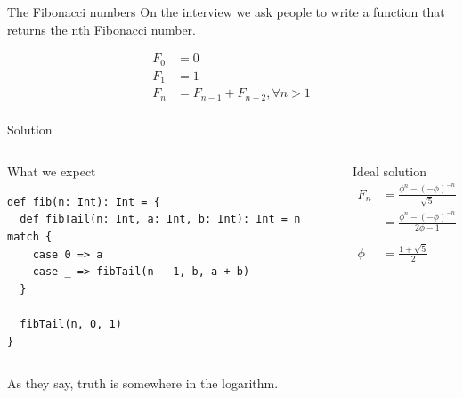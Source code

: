 \documentclass[presentation,aspectratio=169,smaller]{beamer}
\begin{document}
\begin{frame}[label={sec:orgd19d790}]{The Fibonacci numbers}
On the interview we ask people to write a function that returns the nth
Fibonacci number.

\begin{align*}
  F_0 &= 0 \\
  F_1 &= 1 \\
  F_n &= F_{n - 1} + F_{n - 2}, \forall n > 1 \\
\end{align*}
\end{frame}

\begin{frame}[label={sec:orgad12118},fragile]{Solution}
 \begin{columns}
\begin{column}[t]{0.5\columnwidth}
\begin{block}{What we expect}
\begin{verbatim}
def fib(n: Int): Int = {
  def fibTail(n: Int, a: Int, b: Int): Int = n match {
    case 0 => a
    case _ => fibTail(n - 1, b, a + b)
  }

  fibTail(n, 0, 1)
}
\end{verbatim}
\end{block}
\end{column}



\begin{column}[t]{0.5\columnwidth}
\begin{block}{Ideal solution}
\begin{align*}
  F_n &= \frac {\phi ^ n - {(- \phi)}^{-n}} {\sqrt{5}} \\
  &= \frac {\phi ^ n - {(- \phi)}^{-n}} {2\phi - 1} \\
  \\
  \phi &= \frac {1 + \sqrt{5}}{2}
\end{align*}

\pause
\end{block}
\end{column}
\end{columns}

As they say, truth is somewhere in the logarithm.
\end{frame}
\end{document}
